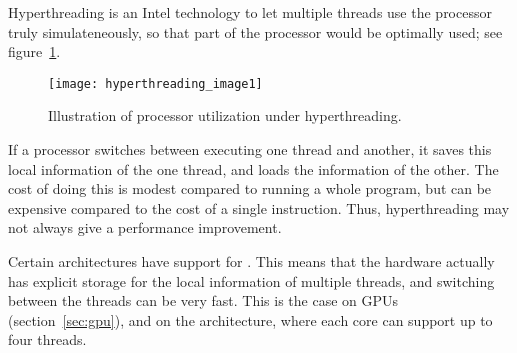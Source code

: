 Hyperthreading is an Intel technology to let multiple threads use the
processor truly simulateneously, so that part of the processor would
be optimally used; see figure~\ref{fig:hyperthread}.
\begin{figure}
\texttt{[image: hyperthreading\_image1]}
\caption{Illustration of processor utilization under hyperthreading.}
\label{fig:hyperthread}
\end{figure}

If a processor switches between executing one thread and another, it saves this
local information of the one thread, and loads the information of the other.
The cost of doing this is modest compared to running a whole program, but 
can be expensive compared to the cost of a single instruction. Thus,
hyperthreading may not always give a performance improvement.

Certain architectures have support
for . This means that the hardware actually
has explicit storage for the local information of multiple threads,
and switching between the threads can be very fast. This is the case
on \acp{GPU} (section~\ref{sec:gpu}), and on
the  architecture, where each core can
support up to four threads.


